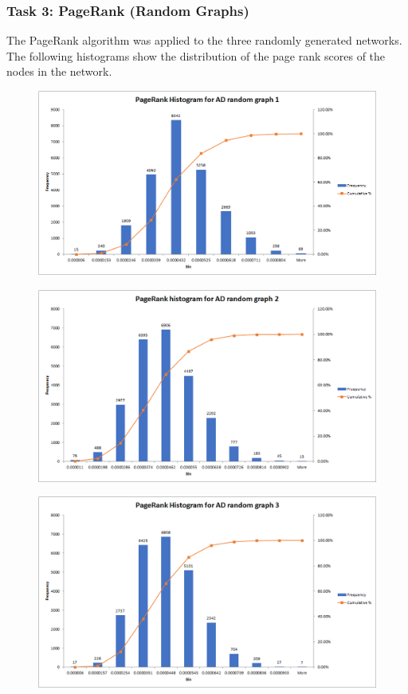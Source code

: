 \documentclass[conference]{IEEEtran}
\begin{document}
		\subsubsection{Task 3: PageRank (Random Graphs)}
			{
				The PageRank algorithm was applied to the three randomly generated networks. The following histograms show the distribution of the page rank scores of the nodes in the network.
			\par}
			\begin{figure}[htbp]
				\centerline{\includegraphics[width=\linewidth]{./images/pagerank_random1.png}}
				\label{pagerank_random1}
			\end{figure}
			\begin{figure}[htbp]
				\centerline{\includegraphics[width=\linewidth]{./images/pagerank_random2.png}}
				\label{pagerank_random2}
			\end{figure}
			\begin{figure}[htbp]
				\centerline{\includegraphics[width=\linewidth]{./images/pagerank_random3.png}}
				\label{pagerank_random3}
			\end{figure}
\end{document}

